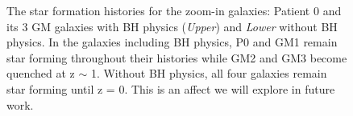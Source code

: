 \documentclass[]{emulateapj}
\begin{document}
\begin{figure}[h!]
\centerline{}
\vspace{-1mm}
\centerline{}
\caption[]{The star formation histories for the zoom-in galaxies: Patient 0 and its 3 GM galaxies with BH physics (\textit{Upper}) and \textit{Lower} without BH physics. In the galaxies including BH physics, P0 and GM1 remain star forming throughout their histories while GM2 and GM3 become quenched at z $\sim$ 1. Without BH physics, all four galaxies remain star forming until z = 0. This is an affect we will explore in future work.}
\label{sfh}
\end{figure}
\end{document}
